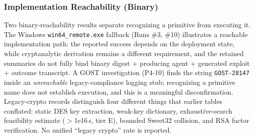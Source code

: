\subsubsection{Implementation Reachability (Binary)}\label{sec:binary}
Two binary-reachability results separate recognizing a primitive from
executing it. The Windows \texttt{win64\_remote.exe} fallback (Runs \#3,
\#10) illustrates a reachable implementation path: the reported success
depends on the deployment state, while cryptanalytic derivation remains a
different requirement, and the retained summaries do not fully bind binary
digest + producing agent + generated exploit + outcome transcript. A GOST
investigation (P4-10) finds the string \texttt{GOST-28147} inside an
\emph{unreachable} legacy-compliance logging stub; recognizing a primitive
name does not establish execution, and this is a meaningful disconfirmation.
Legacy-crypto records distinguish four different things that earlier tables
conflated: static DES key extraction, weak-key dictionary, exhaustive-search
feasibility estimate ($>$1e16\,s, tier E), bounded Sweet32 collision, and RSA
factor verification. No unified ``legacy crypto'' rate is reported.